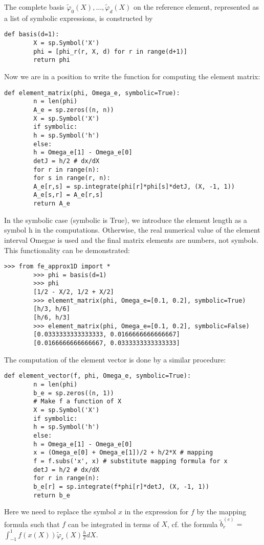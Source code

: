 \documentclass[../main.tex]{subfiles}
\begin{document}
	The complete basis $\tilde{\varphi}_{0}(X), \ldots, \tilde{\varphi}_{d}(X)$ on the reference element, represented as a list of symbolic expressions, is constructed by
	\begin{lstlisting}[numbers=none]
		def basis(d=1):
		X = sp.Symbol('X')
		phi = [phi_r(r, X, d) for r in range(d+1)]
		return phi	
	\end{lstlisting}
	Now we are in a position to write the function for computing the element matrix:
	\begin{lstlisting}[numbers=none]
		def element_matrix(phi, Omega_e, symbolic=True):
		n = len(phi)
		A_e = sp.zeros((n, n))
		X = sp.Symbol('X')
		if symbolic:
		h = sp.Symbol('h')
		else:
		h = Omega_e[1] - Omega_e[0]
		detJ = h/2 # dx/dX
		for r in range(n):
		for s in range(r, n):
		A_e[r,s] = sp.integrate(phi[r]*phi[s]*detJ, (X, -1, 1))
		A_e[s,r] = A_e[r,s]
		return A_e	
	\end{lstlisting}
	In the symbolic case (symbolic is True), we introduce the element length as
	a symbol h in the computations. Otherwise, the real numerical value of the element interval Omega\textunderscore e is used and the final matrix elements are numbers, not
	symbols. This functionality can be demonstrated:
	\begin{lstlisting}[numbers=none]
		>>> from fe_approx1D import *
		>>> phi = basis(d=1)
		>>> phi
		[1/2 - X/2, 1/2 + X/2]
		>>> element_matrix(phi, Omega_e=[0.1, 0.2], symbolic=True)
		[h/3, h/6]
		[h/6, h/3]
		>>> element_matrix(phi, Omega_e=[0.1, 0.2], symbolic=False)
		[0.0333333333333333, 0.0166666666666667]
		[0.0166666666666667, 0.0333333333333333]	
	\end{lstlisting}
	The computation of the element vector is done by a similar procedure:
	\begin{lstlisting}[numbers=none]
		def element_vector(f, phi, Omega_e, symbolic=True):
		n = len(phi)
		b_e = sp.zeros((n, 1))
		# Make f a function of X
		X = sp.Symbol('X')
		if symbolic:
		h = sp.Symbol('h')
		else:
		h = Omega_e[1] - Omega_e[0]
		x = (Omega_e[0] + Omega_e[1])/2 + h/2*X # mapping
		f = f.subs('x', x) # substitute mapping formula for x
		detJ = h/2 # dx/dX
		for r in range(n):
		b_e[r] = sp.integrate(f*phi[r]*detJ, (X, -1, 1))
		return b_e	
	\end{lstlisting}
	Here we need to replace the symbol $x$ in the expression for $f$ by the mapping formula such that $f$ can be integrated in terms of $X$, cf. the formula $\tilde{b}_{r}^{(e)}=$ $\int_{-1}^{1} f(x(X)) \tilde{\varphi}_{r}(X) \frac{h}{2} d X$.
	
\end{document}

